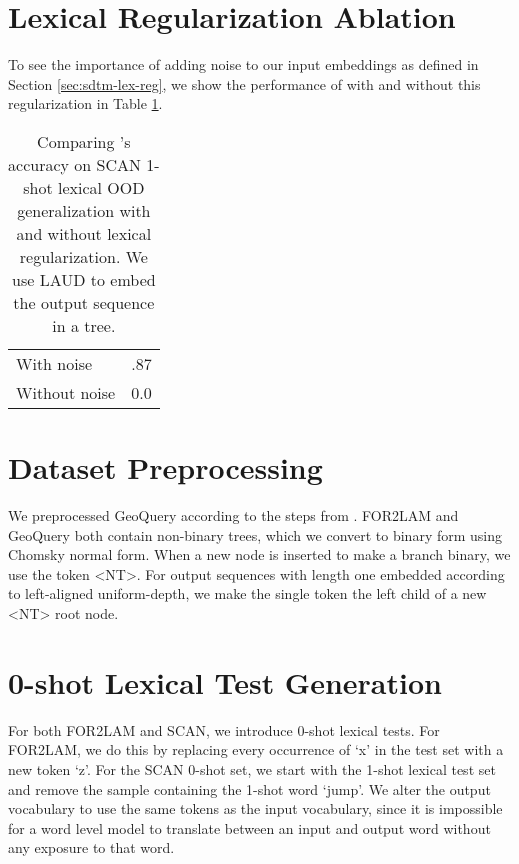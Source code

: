 \section{Lexical Regularization Ablation} \label{sec:sdtm-lex-reg-ablation}
To see the importance of adding noise to our input embeddings as defined in Section \ref{sec:sdtm-lex-reg}, we show the performance of \sdtm with and without this regularization in Table \ref{tab:lex-reg-ablation}. 

\begin{table}
  \caption{Comparing \sdtm's accuracy on SCAN 1-shot lexical OOD generalization with and without lexical regularization. We use LAUD to embed the output sequence in a tree.}
  \label{tab:lex-reg-ablation}
  \centering
  \begin{tabular}{ll}
    \toprule
    With noise     & .87 \\
    Without noise & 0.0 \\
    \bottomrule
\end{tabular}
\end{table}




\section{Dataset Preprocessing} \label{sec:sdtm-data-preprocessing}
We preprocessed GeoQuery according to the steps from \citet{shaw-etal-2021-compositional}. FOR2LAM and GeoQuery both contain non-binary trees, which we convert to binary form using Chomsky normal form. When a new node is inserted to make a branch binary, we use the token <NT>. For output sequences with length one embedded according to left-aligned uniform-depth, we make the single token the left child of a new <NT> root node.

\section{0-shot Lexical Test Generation}
For both FOR2LAM and SCAN, we introduce 0-shot lexical tests. For FOR2LAM, we do this by replacing every occurrence of `x' in the test set with a new token `z'. For the SCAN 0-shot set, we start with the 1-shot lexical test set and remove the sample containing the 1-shot word `jump'. We alter the output vocabulary to use the same tokens as the input vocabulary, since it is impossible for a word level model to translate between an input and output word without any exposure to that word.

